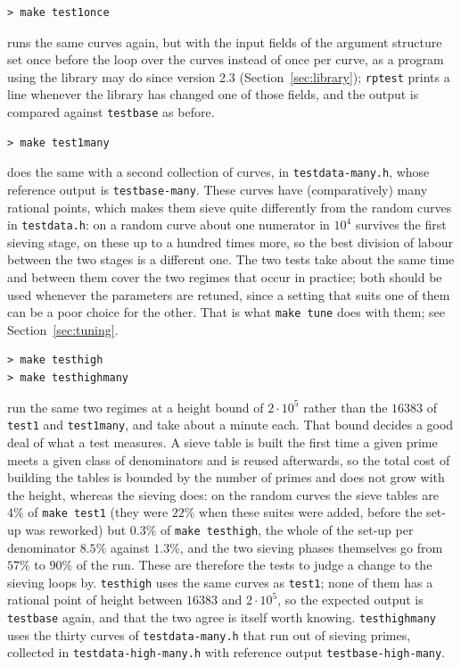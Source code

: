 \documentclass[12pt,a4paper,oneside]{amsart}
\begin{document}
\begin{verbatim}
> make test1once
\end{verbatim}
runs the same curves again, but with the input fields of the argument
structure set once before the loop over the curves instead of once per
curve, as a program using the library may do since version 2.3
(Section~\ref{sec:library}); \texttt{rptest} prints a line whenever the
library has changed one of those fields, and the output is compared
against \texttt{testbase} as before.

\begin{verbatim}
> make test1many
\end{verbatim}
does the same with a second collection of curves, in
\texttt{testdata-many.h}, whose reference output is \texttt{testbase-many}.
These curves have (comparatively) many rational points, which makes them
sieve quite differently from the random curves in \texttt{testdata.h}: on a
random curve about one numerator in $10^4$ survives the first sieving stage,
on these up to a hundred times more, so the best division of labour between
the two stages is a different one. The two tests take about the same time and
between them cover the two regimes that occur in practice; both should be used
whenever the parameters are retuned, since a setting that suits one of them can
be a poor choice for the other. That is what \texttt{make tune} does with them;
see Section~\ref{sec:tuning}.

\begin{verbatim}
> make testhigh
> make testhighmany
\end{verbatim}
run the same two regimes at a height bound of $2\cdot10^5$ rather than the
$16383$ of \texttt{test1} and \texttt{test1many}, and take about a minute
each. That bound decides a good deal of what a test measures. A sieve table
is built the first time a given prime meets a given class of denominators and
is reused afterwards, so the total cost of building the tables is bounded by
the number of primes and does not grow with the height, whereas the sieving
does: on the random curves the sieve tables are $4\%$ of \texttt{make test1}
(they were $22\%$ when these suites were added, before the set-up was
reworked) but $0.3\%$ of \texttt{make testhigh}, the whole of the set-up per
denominator $8.5\%$ against $1.3\%$, and the two sieving phases themselves go
from $57\%$ to $90\%$ of the run. These are therefore the tests to judge a
change to the sieving loops by. \texttt{testhigh} uses the same curves as
\texttt{test1}; none of them has a rational point of height between $16383$
and $2\cdot10^5$, so the expected output is \texttt{testbase} again, and that
the two agree is itself worth knowing. \texttt{testhighmany} uses the thirty
curves of \texttt{testdata-many.h} that run out of sieving primes, collected
in \texttt{testdata-high-many.h} with reference output
\texttt{testbase-high-many}.
\end{document}
